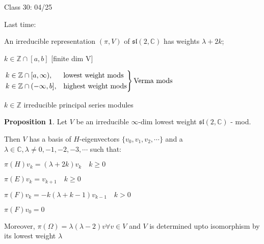 \documentclass{article}
\theoremstyle{definition}
\newtheorem{proposition}{Proposition}
\begin{document}
\hrulefill

Class 30: 04/25

Last time:

An irreducible representation \((\pi, V)\) of \(\mathfrak{sl}(2,\mathbb{C})\) has weights \(\lambda + 2k\);

\(k \in \mathbb{Z} \cap [a,b]\) [finite dim V]

\(\begin{rcases}
    k\in \mathbb{Z} \cap [a,\infty), &\text{lowest weight mods}  \\
    k\in \mathbb{Z} \cap (-\infty, b], &\text{highest weight mods} 
\end{rcases} \text{Verma mods} \) 


\(k\in\mathbb{Z}\) irreducible principal series modules

\begin{proposition}
    Let \(V\) be an irreducible \(\infty\)-dim lowest weight \(\mathfrak{sl}(2,\mathbb{C})\) - mod.
    
    Then \(V\) has a basis of \(H\)-eigenvectors \(\{ v_0, v_1, v_2, \cdots \} \) and a \(\lambda \in \mathbb{C}, \lambda \neq 0, -1, -2, -3, \cdots\) such that:
    
    \(\pi(H)v_k = (\lambda + 2k)v_k \quad k \geq 0\)
    
    \(\pi(E) v_k = v_{k+1} \quad k \geq 0\)
    
    \(\pi(F)v_k = -k(\lambda + k - 1)v_{k-1} \quad k > 0\) 

    \(\pi (F) v_0 = 0\)
    
    Moreover, \(\pi(\Omega) = \lambda (\lambda - 2)v \forall v\in V\) and \(V\) is determined upto isomorphism by its lowest weight \(\lambda\)  
\end{proposition}
\end{document}
